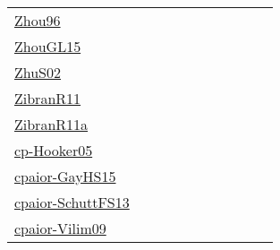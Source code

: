 {\begin{longtable}{p{3cm}p{4cm}p{2cm}p{2cm}p{2cm}p{2cm}p{2cm}p{2cm}p{2cm}p{2cm}}
\href{papers/Zhou96.pdf}{Zhou96}~\cite{Zhou96} &  &  &  &  &  &  &  &  & \\
\href{papers/ZhouGL15.pdf}{ZhouGL15}~\cite{ZhouGL15} &  &  &  &  &  &  &  &  & \\
\href{papers/ZhuS02.pdf}{ZhuS02}~\cite{ZhuS02} &  &  &  &  &  &  &  &  & \\
\href{papers/ZibranR11.pdf}{ZibranR11}~\cite{ZibranR11} &  &  &  &  &  &  &  &  & \\
\href{papers/ZibranR11a.pdf}{ZibranR11a}~\cite{ZibranR11a} &  &  &  &  &  &  &  &  & \\
\href{papers/cp-Hooker05.pdf}{cp-Hooker05}~\cite{cp-Hooker05} &  &  &  &  &  &  &  &  & \\
\href{papers/cpaior-GayHS15.pdf}{cpaior-GayHS15}~\cite{cpaior-GayHS15} &  &  &  &  &  &  &  &  & \\
\href{papers/cpaior-SchuttFS13.pdf}{cpaior-SchuttFS13}~\cite{cpaior-SchuttFS13} &  &  &  &  &  &  &  &  & \\
\href{papers/cpaior-Vilim09.pdf}{cpaior-Vilim09}~\cite{cpaior-Vilim09} &  &  &  &  &  &  &  &  & \\
\end{longtable}
}

